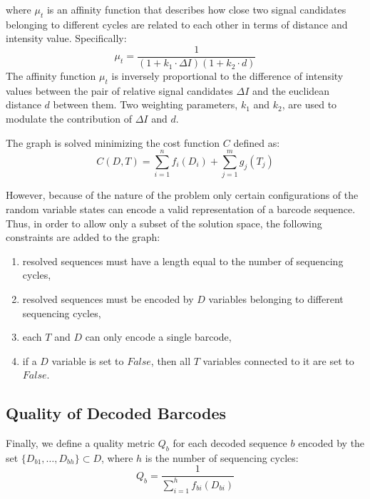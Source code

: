\documentclass[10pt,journal]{IEEEtran}
\begin{document}
where $\mu_t$ is an affinity function that describes how close two signal candidates belonging to different cycles are related to each other in terms of distance and intensity value. Specifically:
\begin{equation}
    \mu_t = \frac{1}{(1+k_1 \cdot \Delta I)(1+k_2 \cdot d)}
\end{equation}
The affinity function $\mu_t$ is inversely proportional to the difference of intensity values between the pair of relative signal candidates $\Delta I$ and the euclidean distance $d$ between them. Two weighting parameters, $k_1$ and $k_2$, are used to modulate the contribution of $\Delta I$ and $d$.

The graph is solved minimizing the cost function $C$ defined as:
\begin{equation}
    C(D,T)=\sum_{i=1}^n f_i(D_i) + \sum_{j=1}^m g_j(T_j)
\end{equation}

However, because of the nature of the problem only certain configurations of the random variable states can encode a valid representation of a barcode sequence. Thus, in order to allow only a subset of the solution space, the following constraints are added to the graph:
\begin{enumerate}
    \item resolved sequences must have a length equal to the number of sequencing cycles,
    \item resolved sequences must be encoded by $D$ variables belonging to different sequencing cycles,
    \item each $T$ and $D$ can only encode a single barcode,
    \item if a $D$ variable is set to $False$, then all $T$ variables connected to it are set to $False$.
\end{enumerate}

\subsection{Quality of Decoded Barcodes}
Finally, we define a quality metric $Q_b$ for each decoded sequence $b$ encoded by the set $\{D_{b1},\dots,D_{bh}\} \subset D$, where $h$ is the number of sequencing cycles:
\begin{equation}
    Q_b = \frac{1}{\sum_{i=1}^h f_{bi}(D_{bi})}
\end{equation}
\end{document}
